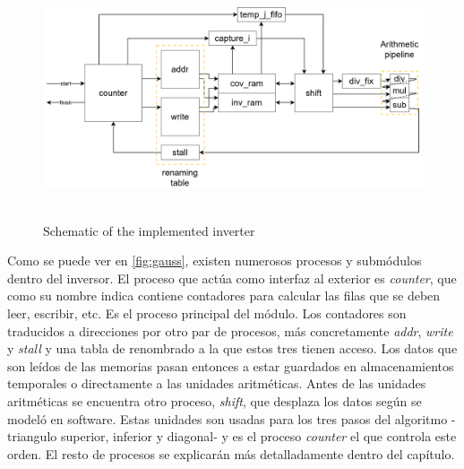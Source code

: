\begin{figure}[h!]
\centering\textbf{
\includegraphics[height=2.5in]{figures/gauss.png}}
\caption{Schematic of the implemented inverter}
  \label{fig:gauss}
\end{figure}
Como se puede ver en \autoref{fig:gauss}, existen numerosos procesos y submódulos dentro del inversor. El proceso que actúa como interfaz al exterior es \textit{counter}, que como su nombre indica contiene contadores para calcular las filas que se deben leer, escribir, etc. Es el proceso principal del módulo. Los contadores son traducidos a direcciones por otro par de procesos, más concretamente \textit{addr}, \textit{write} y \textit{stall} y una tabla de renombrado a la que estos tres tienen acceso. Los datos que son leídos de las memorias pasan entonces a estar guardados en almacenamientos temporales o directamente a las unidades aritméticas. Antes de las unidades aritméticas se encuentra otro proceso, \textit{shift}, que desplaza los datos según se modeló en software. Estas unidades son usadas para los tres pasos del algoritmo -triangulo superior, inferior y diagonal- y es el proceso \textit{counter} el que controla este orden. El resto de procesos se explicarán más detalladamente dentro del capítulo.


